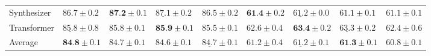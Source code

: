 \begin{table}[htb]
{\begin{tabular}{l | l l l l | l l l l }
    Synthesizer & $86.7 \pm 0.2$ & $\textbf{87.2} \pm 0.1$ & $\underline{87.1} \pm 0.2$ & $86.5 \pm 0.2$ 
    & $\textbf{61.4} \pm 0.2$ & $\underline{61.2} \pm 0.0$ & $61.1 \pm 0.1$ & $61.1 \pm 0.1$\\
    Transformer & $\underline{85.8} \pm 0.8$ & $85.8 \pm 0.1$ & $\textbf{85.9} \pm 0.1$ & $85.5 \pm 0.1$ 
    & $62.6 \pm 0.4$ & $\textbf{63.4} \pm 0.2$ & $\underline{63.3} \pm 0.2$ & $62.4 \pm 0.6$ 
    \\
    \bottomrule
    Average & $\textbf{84.8} \pm 0.1$ & $84.7 \pm 0.1$ & $84.6 \pm 0.1$ & $\underline{84.7} \pm 0.1$ 
    & $61.2 \pm 0.4$ & $\underline{61.2} \pm 0.1$ & $\textbf{61.3} \pm 0.1$ & $60.8 \pm 0.1$\\
            \end{tabular}
    }


\end{table}

